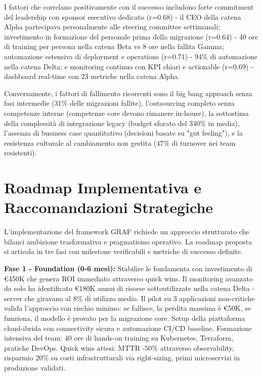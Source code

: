 I fattori che correlano positivamente con il successo includono forte commitment del leadership con sponsor esecutivo dedicato (r=0.68) - il CEO della catena Alpha partecipava personalmente alle steering committee settimanali; investimento in formazione del personale prima della migrazione (r=0.64) - 40 ore di training per persona nella catena Beta vs 8 ore nella fallita Gamma; automazione estensiva di deployment e operations (r=0.71) - 94\% di automazione nella catena Delta; e monitoring continuo con KPI chiari e actionable (r=0.69) - dashboard real-time con 23 metriche nella catena Alpha.

Conversamente, i fattori di fallimento ricorrenti sono il big bang approach senza fasi intermedie (31\% delle migrazioni fallite), l'outsourcing completo senza competenze interne (competenze core devono rimanere in-house), la sottostima della complessità di integrazione legacy (budget sforato del 340\% in media), l'assenza di business case quantitativo (decisioni basate su "gut feeling"), e la resistenza culturale al cambiamento non gestita (47\% di turnover nei team resistenti).

\section{\texorpdfstring{Roadmap Implementativa e Raccomandazioni Strategiche}{3.8 - Roadmap Implementativa e Raccomandazioni Strategiche}}
\label{sec:roadmap}

L'implementazione del framework GRAF richiede un approccio strutturato che bilanci ambizione trasformativa e pragmatismo operativo. La roadmap proposta si articola in tre fasi con milestone verificabili e metriche di successo definite.

\textbf{Fase 1 - Foundation (0-6 mesi):} Stabilire le fondamenta con investimento di €450K che genera ROI immediato attraverso quick wins. Il monitoring avanzato da solo ha identificato €180K annui di risorse sottoutilizzate nella catena Delta - server che giravano al 8\% di utilizzo medio. Il pilot su 3 applicazioni non-critiche valida l'approccio con rischio minimo: se fallisce, la perdita massima è €50K, se funziona, il modello è provato per la migrazione core. Setup della piattaforma cloud-ibrida con connectivity sicura e automazione CI/CD baseline. Formazione intensiva del team: 40 ore di hands-on training su Kubernetes, Terraform, pratiche DevOps. Quick wins attesi: MTTR -50\% attraverso observability, risparmio 20\% su costi infrastrutturali via right-sizing, primi microservizi in produzione validati.


